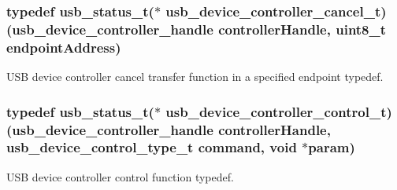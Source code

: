 \hypertarget{group__usb__device__controller__driver_ga476c2b07d6a5e467e104568aad59ef44}{
\subsubsection[{usb\-\_\-device\-\_\-controller\-\_\-cancel\-\_\-t}]{\setlength{\rightskip}{0pt plus 5cm}typedef {\bf usb\-\_\-status\-\_\-t}($\ast$ usb\-\_\-device\-\_\-controller\-\_\-cancel\-\_\-t)({\bf usb\-\_\-device\-\_\-controller\-\_\-handle} controller\-Handle, uint8\-\_\-t endpoint\-Address)}}\label{group__usb__device__controller__driver_ga476c2b07d6a5e467e104568aad59ef44}


U\-S\-B device controller cancel transfer function in a specified endpoint typedef. 

\hypertarget{group__usb__device__controller__driver_gae484b958b5a84af6ce5921f8538ff1c4}{
\subsubsection[{usb\-\_\-device\-\_\-controller\-\_\-control\-\_\-t}]{\setlength{\rightskip}{0pt plus 5cm}typedef {\bf usb\-\_\-status\-\_\-t}($\ast$ usb\-\_\-device\-\_\-controller\-\_\-control\-\_\-t)({\bf usb\-\_\-device\-\_\-controller\-\_\-handle} controller\-Handle, {\bf usb\-\_\-device\-\_\-control\-\_\-type\-\_\-t} command, void $\ast$param)}}\label{group__usb__device__controller__driver_gae484b958b5a84af6ce5921f8538ff1c4}


U\-S\-B device controller control function typedef. 

